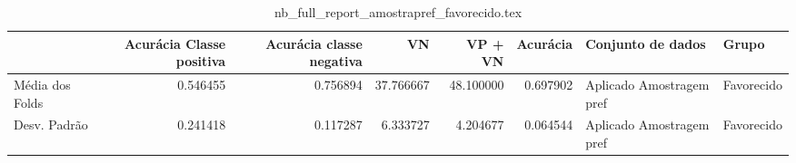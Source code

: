 \begin{table}
\centering
\caption{nb_full_report_amostrapref_favorecido.tex}
\label{nb_full_report_amostrapref_favorecido.tex}
\begin{tabular}{lrrrrrll}
\toprule
{} &  Acurácia Classe positiva &  Acurácia classe negativa &        VN  &   VP + VN  &  Acurácia &         Conjunto de dados &       Grupo \\
\midrule
Média dos Folds &                  0.546455 &                  0.756894 &  37.766667 &  48.100000 &  0.697902 &  Aplicado Amostragem pref &  Favorecido \\
Desv. Padrão    &                  0.241418 &                  0.117287 &   6.333727 &   4.204677 &  0.064544 &  Aplicado Amostragem pref &  Favorecido \\
\bottomrule
\end{tabular}
\end{table}
